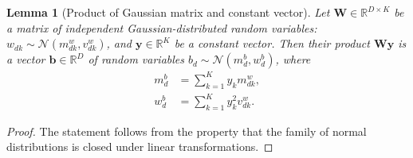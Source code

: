 \documentclass[letterpaper]{article}
\newtheorem{lemma}{Lemma}
\begin{document}
 \begin{lemma}[Product of Gaussian matrix and constant vector]
 \label{thm:matrix_const}
 Let $\mathbf{W} \in \mathbb{R}^{D \times K}$ be a matrix of independent Gaussian-distributed random variables: $w_{dk} \sim \mathcal{N}(m^w_{dk}, v^w_{dk})$, and $\mathbf{y} \in \mathbb{R}^K$ be a constant vector. Then their product $\mathbf{W} \mathbf{y}$ is a vector $\mathbf{b} \in \mathbb{R}^{D}$ of random variables $b_d \sim \mathcal{N}(m^b_d, w^b_d)$, where 
\begin{subequations}
\begin{align}
m^b_d &= \sum_{k=1}^Ky_k m^w_{dk}, \\
w^b_d &= \sum_{k=1}^Ky_k^2v^w_{dk}.
 \end{align}
\end{subequations}
 
 \end{lemma}
 \begin{proof}
 	The statement follows from the property that the family of normal distributions is closed under linear transformations.
 \end{proof}
 
\end{document}
